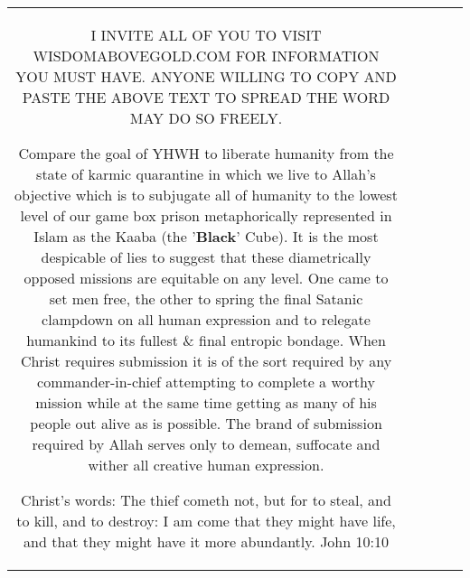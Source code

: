 \documentclass[11pt]{article}
\newlength\mylength
\begin{document}
\begin{center}
\begin{longtable}{|C{.65\mylength}|C{.30\mylength}|C{.12\mylength}|C{.12\mylength}|C{.12\mylength}|}
I INVITE ALL OF YOU TO VISIT WISDOMABOVEGOLD.COM FOR INFORMATION YOU MUST HAVE. ANYONE WILLING TO COPY AND PASTE THE ABOVE TEXT TO SPREAD THE WORD MAY DO SO FREELY. 
              


Compare the goal of YHWH to liberate humanity from the state of karmic quarantine in which we live to Allah's objective which is to subjugate all of humanity to the lowest level of our game box prison metaphorically represented in Islam as the Kaaba (the '\textbf{Black}' Cube). It is the most despicable of lies to suggest that these diametrically opposed missions are equitable on any level. One came to set men free, the other to spring the final Satanic clampdown on all human expression and to relegate humankind to its fullest \& final entropic bondage. When Christ requires submission it is of the sort required by any commander-in-chief attempting to complete a worthy mission while at the same time getting as many of his people out alive as is possible. The brand of submission required by Allah serves only to demean, suffocate and wither all creative human expression. 

Christ's words: 
The thief cometh not, but for to steal, and to kill, and to destroy: 
I am come that they might have life, 
and that they might have it more abundantly. 
John 10:10 


\end{longtable}
\end{center}
\end{document}
